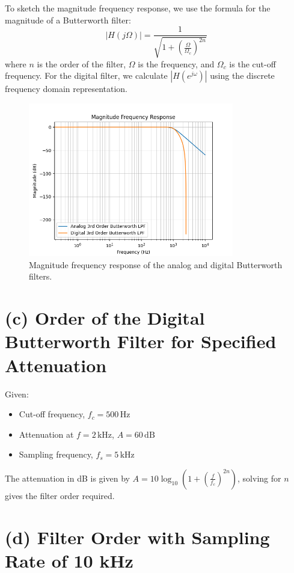 \documentclass{article}
\begin{document}
To sketch the magnitude frequency response, we use the formula for the magnitude of a Butterworth filter:
\[
|H(j\Omega)| = \frac{1}{\sqrt{1 + \left(\frac{\Omega}{\Omega_c}\right)^{2n}}}
\]
where $n$ is the order of the filter, $\Omega$ is the frequency, and $\Omega_c$ is the cut-off frequency. For the digital filter, we calculate $|H(e^{j\omega})|$ using the discrete frequency domain representation.
\begin{figure}[H]
    \centering
    \includegraphics[width=0.8\textwidth]{Figure_1.png}
    \caption{Magnitude frequency response of the analog and digital Butterworth filters.}
\end{figure}

\section*{(c) Order of the Digital Butterworth Filter for Specified Attenuation}

Given:
\begin{itemize}
    \item Cut-off frequency, $f_c = 500 \, \text{Hz}$
    \item Attenuation at $f = 2 \, \text{kHz}$, $A = 60 \, \text{dB}$
    \item Sampling frequency, $f_s = 5 \, \text{kHz}$
\end{itemize}

The attenuation in dB is given by $A = 10 \log_{10}\left(1 + \left(\frac{f}{f_c}\right)^{2n}\right)$, solving for $n$ gives the filter order required.

\section*{(d) Filter Order with Sampling Rate of 10 kHz}
\end{document}
